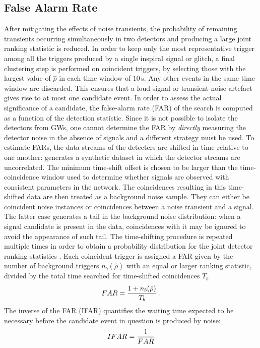 \documentclass[binding=0.6cm, LaM]{sapthesis}
\begin{document}
\subsection{False Alarm Rate}
\label{subsec:far}
	After mitigating the effects of noise transients, the probability of remaining transients 
	occurring simultaneously in two detectors and producing a large joint 
	ranking statistic is reduced.
	In order to keep only the most representative trigger among all the triggers produced by a single inspiral signal or glitch, 
	a final clustering step is performed on coincident triggers, 
	by selecting those with the largest value of $\hat \rho$ 
	in each time window of $10$\,s. 
	Any other events in the same time window are discarded. 
	This ensures that a loud signal or transient noise artefact gives rise to at most one candidate event.
	In order to assess the actual significance of a candidate, 
	the false-alarm rate (FAR) of the search is computed as a function of the detection statistic.
  	Since it is not possible to isolate the detectors from GWs, 
	one cannot determine the FAR by \emph{directly} measuring the detector noise in the absence 
	of signals and a different strategy must be used.
 	To estimate FARs, the data streams of the detecters are shifted in time relative to one another: 
	generates a synthetic dataset in which the detector streams are uncorrelated.
	The minimum time-shift offset is chosen to be larger than the time-coincidence window 
	used to determine whether signals are observed with consistent parameters in the network.
	The coincidences resulting in this time-shifted data are then treated as a background noise sample.
	They can either be coincident noise instances or coincidences between a noise transient and a signal.
	The latter case generates a tail in the background noise distribution: 
	when a signal candidate is present in the data, coincidences with it 
	may be ignored to avoid the appearance of such tail.
	The time-shifting procedure is repeated multiple times in order to obtain a probability distribution 
	for the joint detector ranking statistics \cite{44}. 
	Each coincident trigger is assigned a FAR given by the number 
	of background triggers $n_b(\hat \rho)$ with an equal or larger ranking statistic, 
	divided by the total time searched for time-shifted coincidences $T_b$
        \begin{equation}
          FAR = {{1 + n_b(\hat \rho)} \over {T_b}}\,.
        \end{equation}
        The inverse of the FAR (IFAR) quantifies the waiting time expected to be necessary 
	before the candidate event in question is produced by noise:
        \begin{equation}
          IFAR = {1 \over {FAR}}
        \end{equation}
\end{document}
